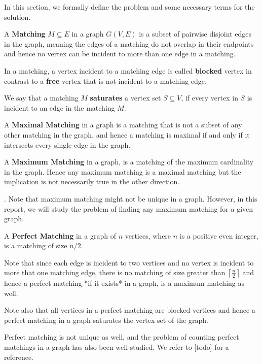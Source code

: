 In this section, we formally define the problem and some necessary terms for the solution.

\begin{definition}
A \textbf{Matching} $M \subseteq E$ in a graph $G(V, E)$ is a subset of pairwise disjoint edges in the graph, meaning the edges of a matching do not overlap in their endpoints and hence no vertex can be incident to more than one edge in a matching.
\end{definition}
In a matching, a vertex incident to a matching edge is called \textbf{blocked} vertex in contrast to a \textbf{free} vertex that is not incident to a matching edge.

We say that a matching $M$ \textbf{saturates} a vertex set $S \subseteq V$, if every vertex in $S$ is incident to an edge in the matching $M$.

\begin{definition}
A \textbf{Maximal Matching} in a graph is a matching that is not a subset of any other matching in the graph, and hence a matching is maximal if and only if it intersects every single edge in the graph.
\end{definition}

\begin{definition}
A \textbf{Maximum Matching} in a graph, is a matching of the maximum cardinality in the graph. Hence any maximum matching is a maximal matching but the implication is not necessarily true in the other direction.
\end{definition}.
Note that maximum matching might not be unique in a graph. However, in this report, we will study the problem of finding any maximum matching for a given graph.

\begin{definition}
A \textbf{Perfect Matching} in a graph of $n$ vertices, where $n$ is a positive even integer, is a matching of size $n/2$.
\end{definition}
Note that since each edge is incident to two vertices and no vertex is incident to more that one matching edge, there is no matching of size greater than $\ceil*{ \frac{n}{2}}$ and hence a perfect matching *if it exists* in a graph, is a maximum matching as well.

Note also that all vertices in a perfect matching are blocked vertices and hence a perfect matching in a graph saturates the vertex set of the graph.

Perfect matching is not unique as well, and the problem of counting perfect matchings in a graph has also been well studied. We refer to [todo] for a reference.

